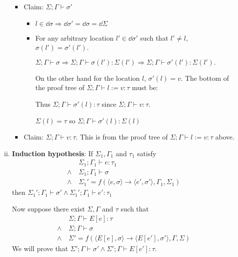 \begin{enumerate}[(a)]
\begin{enumerate}[i.]
  \begin{itemize}
  \item Claim: $\Sigma;\Gamma \vdash \sigma'$
    \begin{itemize}
    \item $l \in \dd \sigma\Rightarrow \dd \sigma' = \dd \sigma = \dd \Sigma$
    \item For any arbitrary location $l' \in \dd \sigma'$ such that $l' \neq l$, $\sigma(l') = \sigma'(l')$.

    $\Sigma; \Gamma \vdash \sigma \Rightarrow\Sigma;\Gamma \vdash \sigma(l') : \Sigma(l') \Rightarrow \Sigma; \Gamma \vdash \sigma'(l') : \Sigma(l').$

    On the other hand for the location $l$, $\sigma'(l) = v$. The bottom of the proof tree of $\Sigma; \Gamma \vdash l := v : \tau$ must be:


  Thus $\Sigma; \Gamma \vdash \sigma'(l) : \tau$ since $\Sigma; \Gamma \vdash v : \tau$. 

  $\Sigma(l) = \tau$ so $\Sigma; \Gamma \vdash \sigma'(l) : \Sigma(l)$
  \end{itemize}
  \item Claim: $\Sigma;\Gamma \vdash v : \tau$. This is from the proof tree of $\Sigma; \Gamma \vdash l := v : \tau$ above.
  \end{itemize}
\item 

  \textbf{Induction hypothesis}: If $\Sigma_1, \Gamma_1$ and $\tau_1$ satisfy
  \begin{align*}
  &\Sigma_1;\Gamma_1 \vdash e : \tau_1 \\
  \wedge~&\Sigma_1;\Gamma_1 \vdash \sigma\\
  \wedge~&\Sigma_1' = f(\langle e, \sigma \rangle \rightarrow \langle e', \sigma' \rangle, \Gamma_1, \Sigma_1)
  \end{align*}
then $\Sigma_1';\Gamma_1 \vdash \sigma' \wedge \Sigma_1';\Gamma_1 \vdash e' : \tau_1$

Now suppose there exist $\Sigma, \Gamma$ and $\tau$ such that
\begin{align*}
&\Sigma;\Gamma \vdash E[e] : \tau \\
\wedge~&\Sigma;\Gamma \vdash \sigma\\
\wedge~&\Sigma' = f(\langle E[e], \sigma \rangle \rightarrow \langle E[e'], \sigma' \rangle, \Gamma, \Sigma)
\end{align*}
We will prove that $\Sigma';\Gamma \vdash \sigma' \wedge \Sigma';\Gamma \vdash E[e'] : \tau$.


\end{enumerate}
\end{enumerate}
